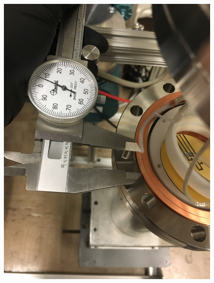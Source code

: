 \begin{figure}[htbp]
\begin{minipage}{0.33\textwidth}
    \includegraphics[width=\linewidth]{figures/testbed/ft6_2.jpg}
    \end{minipage}
        \hspace{\fill} %
    \begin{minipage}{0.33\textwidth}

\end{minipage}
\end{figure}
